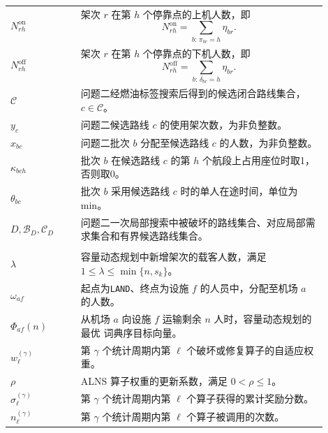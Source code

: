 \documentclass[UTF8,a4paper,zihao=5]{ctexart}
\begin{document}
\begin{longtable}{
    >{\centering\arraybackslash}p{0.20\linewidth}
    p{0.70\linewidth}
}
$N_{rh}^{\mathrm{on}}$
& 架次 $r$ 在第 $h$ 个停靠点的上机人数，即
\[
N_{rh}^{\mathrm{on}}=\sum_{b:\,\pi_{br}=h}\eta_{br}.
\] \\

$N_{rh}^{\mathrm{off}}$
& 架次 $r$ 在第 $h$ 个停靠点的下机人数，即
\[
N_{rh}^{\mathrm{off}}=\sum_{b:\,\delta_{br}=h}\eta_{br}.
\] \\

$\mathcal C$
& 问题二经燃油标签搜索后得到的候选闭合路线集合，$c\in\mathcal C$。 \\

$y_c$
& 问题二候选路线 $c$ 的使用架次数，为非负整数。 \\

$x_{bc}$
& 问题二批次 $b$ 分配至候选路线 $c$ 的人数，为非负整数。 \\

$\kappa_{bch}$
& 批次 $b$ 在候选路线 $c$ 的第 $h$ 个航段上占用座位时取1，否则取0。 \\

$\theta_{bc}$
& 批次 $b$ 采用候选路线 $c$ 时的单人在途时间，单位为 min。 \\

$D,\mathcal B_D,\mathcal C_D$
& 问题二一次局部搜索中被破坏的路线集合、对应局部需求集合和有界候选路线集合。 \\

\midrule
\multicolumn{2}{l}{\textbf{问题一辅助函数与ALNS算法变量}} \\[2pt]

$\lambda$
& 容量动态规划中新增架次的载客人数，满足
$1\leq\lambda\leq\min\{n,s_k\}$。 \\

$\omega_{af}$
& 起点为\texttt{LAND}、终点为设施 $f$ 的人员中，分配至机场 $a$ 的人数。 \\

$\Phi_{af}(n)$
& 从机场 $a$ 向设施 $f$ 运输剩余 $n$ 人时，容量动态规划的最优
词典序目标向量。 \\

$w_{\ell}^{(\gamma)}$
& 第 $\gamma$ 个统计周期内第 $\ell$ 个破坏或修复算子的自适应权重。 \\

$\rho$
& ALNS 算子权重的更新系数，满足 $0<\rho\leq 1$。 \\

$\sigma_{\ell}^{(\gamma)}$
& 第 $\gamma$ 个统计周期内第 $\ell$ 个算子获得的累计奖励分数。 \\

$n_{\ell}^{(\gamma)}$
& 第 $\gamma$ 个统计周期内第 $\ell$ 个算子被调用的次数。 \\[2pt]


\end{longtable}
\end{document}
